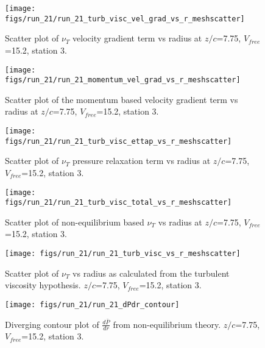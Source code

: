 \begin{figure}[H]
\centering
\texttt{[image: figs/run\_21/run\_21\_turb\_visc\_vel\_grad\_vs\_r\_meshscatter]}
\caption{Scatter plot of $\nu_T$ velocity gradient term vs radius at $z/c$=7.75, $V_{free}$=15.2, station 3.}
\end{figure}


\begin{figure}[H]
\centering
\texttt{[image: figs/run\_21/run\_21\_momentum\_vel\_grad\_vs\_r\_meshscatter]}
\caption{Scatter plot of the momentum based velocity gradient term vs radius at $z/c$=7.75, $V_{free}$=15.2, station 3.}
\end{figure}


\begin{figure}[H]
\centering
\texttt{[image: figs/run\_21/run\_21\_turb\_visc\_ettap\_vs\_r\_meshscatter]}
\caption{Scatter plot of $\nu_T$ pressure relaxation term vs radius at $z/c$=7.75, $V_{free}$=15.2, station 3.}
\end{figure}


\begin{figure}[H]
\centering
\texttt{[image: figs/run\_21/run\_21\_turb\_visc\_total\_vs\_r\_meshscatter]}
\caption{Scatter plot of non-equilibrium based $\nu_T$ vs radius at $z/c$=7.75, $V_{free}$=15.2, station 3.}
\end{figure}


\begin{figure}[H]
\centering
\texttt{[image: figs/run\_21/run\_21\_turb\_visc\_vs\_r\_meshscatter]}
\caption{Scatter plot of $\nu_T$ vs radius as calculated from the turbulent viscosity hypothesis. $z/c$=7.75, $V_{free}$=15.2, station 3.}
\end{figure}


\begin{figure}[H]
\centering
\texttt{[image: figs/run\_21/run\_21\_dPdr\_contour]}
\caption{Diverging contour plot of $\frac{d\bar{P}}{dr}$ from non-equilibrium theory. $z/c$=7.75, $V_{free}$=15.2, station 3.}
\end{figure}


